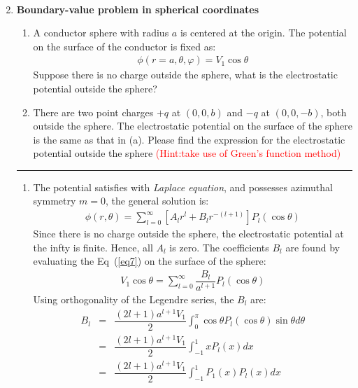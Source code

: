\documentclass[a4paper,11pt]{article}
\begin{document}
\begin{enumerate}
\begin{enumerate}
\begin{eqnarray}
        \end{eqnarray}
    \end{enumerate}
    \item \textbf{Boundary-value problem in spherical coordinates}
    \begin{enumerate}
        \item A conductor sphere with radius $a$ is centered at the origin. The potential on the surface of the conductor is fixed as:
        \begin{eqnarray}
            \phi(r=a,\theta,\varphi)=V_1\cos\theta \nonumber
        \end{eqnarray}
        Suppose there is no charge outside the sphere, what is the electrostatic potential outside the sphere?
        \item There are two point charges $+q$ at $(0,0,b)$ and $-q$ at $(0,0,-b)$, both outside the sphere. The electrostatic potential on the surface of the sphere is the same as that in (a). Please find the expression for the electrostatic potential outside the sphere \textcolor{red}{(Hint:take use of Green's function method)}
    \end{enumerate}
    \rule[0pt]{6cm}{0.05em}
    \begin{enumerate}
        \item The potential satisfies with \textit{Laplace equation}, and possesses azimuthal symmetry $m=0$, the general solution is:
        \begin{eqnarray}\label{eq7}
            \phi(r,\theta)=\sum\limits_{l=0}^{\infty}\left[A_lr^l+B_lr^{-(l+1)}\right]P_l(\cos\theta)
        \end{eqnarray}
        Since there is no charge outside the sphere, the electrostatic potential at the infty is finite. Hence, all $A_l$ is zero. The coefficients $B_l$ are found by evaluating the Eq~(\ref{eq7}) on the surface of the sphere:
        \begin{eqnarray}
            V_1\cos\theta=\sum\limits_{l=0}^{\infty}\dfrac{B_l}{a^{l+1}}P_l(\cos\theta)
        \end{eqnarray}
        Using orthogonality of the Legendre series, the $B_l$ are:
        \begin{eqnarray}
            B_l&=&\dfrac{(2l+1)a^{l+1}V_1}{2}\int_{0}^{\pi}\cos\theta P_l(\cos\theta)\sin\theta d\theta \nonumber\\
            &=&\dfrac{(2l+1)a^{l+1}V_1}{2}\int_{-1}^{1}xP_l(x)dx \nonumber \\
            &=&\dfrac{(2l+1)a^{l+1}V_1}{2}\int_{-1}^{1}P_1(x)P_l(x)dx \nonumber \\

\end{eqnarray}
\end{enumerate}
\end{enumerate}
\end{document}
